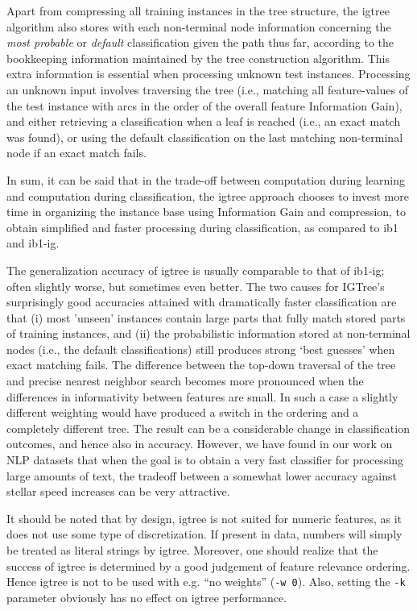 \documentclass{report}
\begin{document}
Apart from compressing all training instances in the tree structure,
the {\sc igtree} algorithm also stores with each non-terminal node
information concerning the {\em most probable} or {\em default}
classification given the path thus far, according to the bookkeeping
information maintained by the tree construction algorithm. This extra
information is essential when processing unknown test instances.
Processing an unknown input involves traversing the tree (i.e.,
matching all feature-values of the test instance with arcs in the
order of the overall feature Information Gain), and either retrieving
a classification when a leaf is reached (i.e., an exact match was
found), or using the default classification on the last matching
non-terminal node if an exact match fails.

In sum, it can be said that in the trade-off between computation
during learning and computation during classification, the {\sc
igtree} approach chooses to invest more time in organizing the
instance base using Information Gain and compression, to obtain
simplified and faster processing during classification,
as compared to {\sc ib1} and {\sc ib1-ig}.

The generalization accuracy of {\sc igtree} is usually comparable to
that of {\sc ib1-ig}; often slightly worse, but sometimes even better.
The two causes for {\sc IGTree}'s surprisingly good accuracies
attained with dramatically faster classification are that (i) most
'unseen' instances contain large parts that fully match stored parts
of training instances, and (ii) the probabilistic information stored
at non-terminal nodes (i.e., the default classifications) still
produces strong `best guesses' when exact matching fails. The
difference between the top-down traversal of the tree and precise
nearest neighbor search becomes more pronounced when the differences
in informativity between features are small. In such a case a slightly
different weighting would have produced a switch in the ordering and a
completely different tree. The result can be a considerable change in
classification outcomes, and hence also in accuracy. However, we have
found in our work on NLP datasets that when the goal is to obtain a
very fast classifier for processing large amounts of text, the
tradeoff between a somewhat lower accuracy against stellar speed
increases can be very attractive.

It should be noted that by design, {\sc igtree} is not suited for
numeric features, as it does not use some type of discretization. If
present in data, numbers will simply be treated as literal strings by
{\sc igtree}. Moreover, one should realize that the success of {\sc
  igtree} is determined by a good judgement of feature relevance
ordering. Hence {\sc igtree} is not to be used with e.g. ``no
weights'' ({\tt -w 0}). Also, setting the {\tt -k} parameter obviously
has no effect on {\sc igtree} performance.
\end{document}
